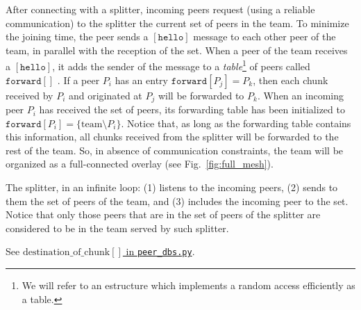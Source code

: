 

\label{sec:joining}

After connecting with a splitter, incoming peers request (using a
reliable communication) to the splitter the current set of peers in
the team. To minimize the joining time, the peer sends a
$[\mathtt{hello}]$ message to each other peer of the team, in parallel
with the reception of the set. When a peer of the team receives a
$[\mathtt{hello}]$, it adds the sender of the message to a
\emph{table}\footnote{We will refer to an estructure which implements
  a random access efficiently as a table.} of peers called
$\mathtt{forward}[]$ . If a peer $P_i$ has an entry
$\mathtt{forward}[P_j]=P_k$, then each chunk received by $P_i$ and
originated at $P_j$ will be forwarded to $P_k$. When an incoming peer
$P_i$ has received the set of peers, its forwarding table has been
initialized to $\mathtt{forward}[P_i]=\{\text{team}\setminus
P_i\}$. Notice that, as long as the forwarding table contains this
information, all chunks received from the splitter will be forwarded
to the rest of the team. So, in absence of communication constraints,
the team will be organized as a full-connected overlay (see
Fig.~\ref{fig:full_mesh}).


The splitter, in an infinite loop: (1) listens to the incoming peers,
(2) sends to them the set of peers of the team, and (3) includes the
incoming peer to the set. Notice that only those peers that are in
the set of peers of the splitter are considered to be in the team
served by such splitter.

\begin{comment}
\begin{figure*}
  \fig{1000}{10cm}{joining} \caption{Code related to team
    joining.\label{fig:joining}}
\end{figure*}

The new pseudo-code related to joining a team is describen in the
Fig.~\ref{fig:joining}.
\end{comment}

\begin{notex}
  See \href{https://github.com/P2PSP/simulator/blob/f0c73be1817e7d3b816cc61cd2c8e59b17f9a0e6/src/core/splitter_dbs.py#L296}{$\text{destination\_of\_chunk}[]$ in \texttt{peer\_dbs.py}}.
\end{notex}
